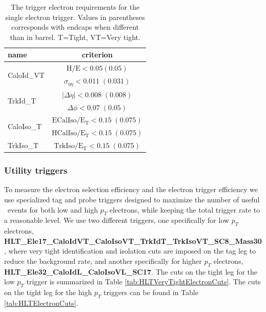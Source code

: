 \begin{table}[htb]
 \caption{The trigger electron requirements for the single electron trigger. 
Values in parentheses corresponds with endcaps when different than in 
barrel. T=Tight, VT=Very tight.}
 \label{tab:HLTTightElectronCuts}
 \centering
 \begin{tabular}{|l||c|}
   \hline
   name                       &  criterion \\
   \hline \hline
   \multirow{2}{*}{CaloId\_VT} & $\mathrm{H/E < 0.05 (0.05) }$ \\
                               & $\sigma_{\eta\eta}\mathrm{< 0.011\;(0.031)}$ \\
    \hline
    \multirow{2}{*}{TrkId\_T} & $|\Delta\eta|\mathrm{< 0.008\; (0.008)}$ \\
                               & $\Delta\phi\mathrm{< 0.07\;(0.05)}$  \\
    \hline
    \multirow{2}{*}{CaloIso\_T} & $\mathrm{ECalIso/E_T <0.15\;(0.075)}$ \\
                                 & $\mathrm{HCalIso/E_T <0.15\;(0.075)}$ \\    
    \hline
    TrkIso\_T                   & $\mathrm{TrkIso/E_T <0.15\;(0.075)}$ \\

   \hline
 \end{tabular}
\end{table}


\subsubsection{Utility triggers}
\label{sec:utilityTriggers}

To measure the electron selection efficiency and the electron trigger
efficiency we use specialized tag and probe triggers designed to maximize
the number of useful \dyll~events for both low and high $p_{T}$ electrons,
while keeping the total trigger rate to a reasonable level. We use 
two different triggers, one specifically for low $p_{T}$ electrons,
{\bf HLT\_Ele17\_CaloIdVT\_CaloIsoVT\_TrkIdT\_TrkIsoVT\_SC8\_Mass30}, 
where very tight identification and isolation cuts are imposed on the 
tag leg to reduce the background rate, and another specifically for
higher $p_{T}$ electrons, {\bf HLT\_Ele32\_CaloIdL\_CaloIsoVL\_SC17}.
The cuts on the tight leg for the low $p_{T}$ trigger is summarized in 
Table \ref{tab:HLTVeryTightElectronCuts}. The cuts on the tight leg
for the high $p_{T}$ triggers can be found in 
Table \ref{tab:HLTElectronCuts}. 

